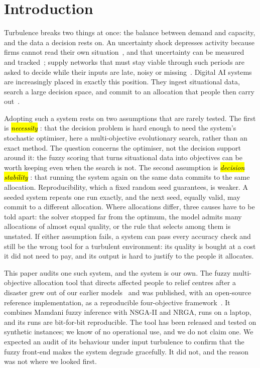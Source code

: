 \documentclass[systems,article,accept,moreauthors,pdftex]{Definitions/mdpi}
\begin{document}
\section{Introduction}\label{sec:intro}

Turbulence breaks two things at once: the balance between demand and capacity, and the
data a decision rests on. An uncertainty shock depresses activity because firms cannot
read their own situation~\cite{bloom2009uncertainty}, and that uncertainty can be measured
and tracked~\cite{baker2016epu}; supply networks that must stay viable through such
periods are asked to decide while their inputs are late, noisy or missing~\cite{ivanov2020viability,ivanov2020covid}.
Digital AI systems are increasingly placed in exactly this position. They ingest
situational data, search a large decision space, and commit to an allocation that people
then carry out~\cite{modgil2022ai,belhadi2024ai,pan2025aiusage}.

Adopting such a system rests on two assumptions that are rarely tested. The first is
\emph{\hl{necessity}%
}: that the decision problem is hard enough to need the system's stochastic
optimiser, here a multi-objective evolutionary search, rather than an exact method. The
question concerns the optimiser, not the decision support around it: the fuzzy scoring that
turns situational data into objectives can be worth keeping even when the search is not. The
second assumption is \emph{\hl{decision stability}%
}: that running the system again on the same
data commits to the same allocation. Reproducibility, which a fixed random seed guarantees,
is weaker. A seeded system repeats one run exactly, and the next seed, equally valid, may
commit to a different allocation. Where allocations differ, three causes have to be told
apart: the solver stopped far from the optimum, the model admits many allocations of almost
equal quality, or the rule that selects among them is unstated. If either assumption fails, a
system can pass every accuracy check and still be the wrong tool for a turbulent environment:
its quality is bought at a cost it did not need to pay, and its output is hard to justify to
the people it allocates.

This paper audits one such system, and the system is our own. The fuzzy multi-objective
allocation tool that directs affected people to relief centres after a disaster grew out of
our earlier models~\cite{rabiei2021vehicle,rabiei2023volunteer} and was published, with an
open-source reference implementation, as a reproducible four-objective
framework~\cite{rabiei2026resilient}. It combines Mamdani fuzzy inference with NSGA-II and
NRGA, runs on a laptop, and its runs are bit-for-bit reproducible. The tool has been released
and tested on synthetic instances; we know of no operational use, and we do not claim one. We
expected an audit of its behaviour under input turbulence to confirm that the fuzzy front-end
makes the system degrade gracefully. It did not, and the reason was not where we looked first.
\end{document}
